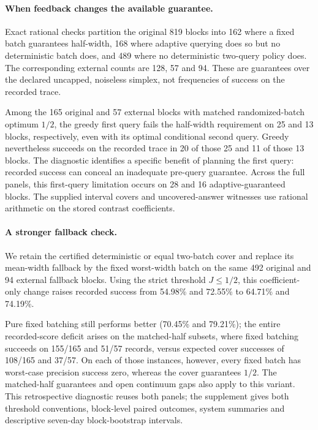 \paragraph{When feedback changes the available guarantee.}
Exact rational checks partition the original 819 blocks into 162 where a fixed batch guarantees half-width, 168 where adaptive querying does so but no deterministic batch does, and 489 where no deterministic two-query policy does. The corresponding external counts are 128, 57 and 94. These are guarantees over the declared uncapped, noiseless simplex, not frequencies of success on the recorded trace.

Among the 165 original and 57 external blocks with matched randomized-batch optimum $1/2$, the greedy first query fails the half-width requirement on 25 and 13 blocks, respectively, even with its optimal conditional second query. Greedy nevertheless succeeds on the recorded trace in 20 of those 25 and 11 of those 13 blocks. The diagnostic identifies a specific benefit of planning the first query: recorded success can conceal an inadequate pre-query guarantee. Across the full panels, this first-query limitation occurs on 28 and 16 adaptive-guaranteed blocks. The supplied interval covers and uncovered-answer witnesses use rational arithmetic on the stored contrast coefficients.

\paragraph{A stronger fallback check.}
We retain the certified deterministic or equal two-batch cover and replace its mean-width fallback by the fixed worst-width batch on the same 492 original and 94 external fallback blocks. Using the strict threshold $J\leq1/2$, this coefficient-only change raises recorded success from 54.98\% and 72.55\% to 64.71\% and 74.19\%.

Pure fixed batching still performs better (70.45\% and 79.21\%); the entire recorded-score deficit arises on the matched-half subsets, where fixed batching succeeds on 155/165 and 51/57 records, versus expected cover successes of 108/165 and 37/57. On each of those instances, however, every fixed batch has worst-case precision success zero, whereas the cover guarantees $1/2$. The matched-half guarantees and open continuum gaps also apply to this variant. This retrospective diagnostic reuses both panels; the supplement gives both threshold conventions, block-level paired outcomes, system summaries and descriptive seven-day block-bootstrap intervals.
